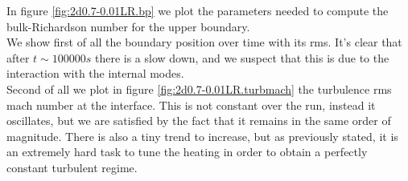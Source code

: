 \begin{figure}[t]
  \centering
      \hfill
	  \label{2d0.7-0.01LR.passive}
  \end{figure}
In figure \ref{fig:2d0.7-0.01LR.bp} we plot the parameters needed to compute the bulk-Richardson number for the upper boundary. \\
We show first of all the boundary position over time with its rms. It's clear that after $t \sim 100000 s$ there is a slow down, and we suspect that this is due to the interaction with the internal modes. \\
Second of all we plot in figure \ref{fig:2d0.7-0.01LR.turbmach} the turbulence rms mach number at the interface. This is not constant over the run, instead it oscillates, but we are satisfied by the fact that it remains in the same order of magnitude. There is also a tiny trend to increase, but as previously stated, it is an extremely hard task to tune the heating in order to obtain a perfectly constant turbulent regime. \\
